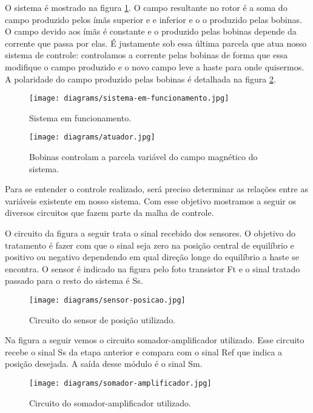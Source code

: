 O sistema é mostrado na figura \ref{fig:system}. O campo resultante no rotor é a soma do campo produzido pelos ímãs superior e e inferior e o o produzido pelas bobinas. O campo devido aos ímãs é constante e o produzido pelas bobinas depende da corrente que passa por elas. É justamente sob essa última parcela que atua nosso sistema de controle: controlamos a corrente pelas bobinas de forma que essa modifique o campo produzido e o novo campo leve a haste para onde quisermos. A polaridade do campo produzido pelas bobinas é detalhada na figura \ref{fig:atuador}.

\begin{figure}[H]
\centering
\texttt{[image: diagrams/sistema-em-funcionamento.jpg]}
\caption{Sistema em funcionamento.}
\label{fig:system}
\end{figure}

\begin{figure}[H]
\centering
\texttt{[image: diagrams/atuador.jpg]}
\caption{Bobinas controlam a parcela variável do campo magnético do sistema.}
\label{fig:atuador}
\end{figure}

Para se entender o controle realizado, será preciso determinar as
relações entre as variáveis existente em nosso sistema. Com esse 
objetivo mostramos a seguir os diversos circuitos que fazem parte da
malha de controle.


O circuito da figura a seguir trata o sinal recebido dos sensores. 
O objetivo do tratamento é fazer com que o sinal seja zero na posição central de equilíbrio e positivo ou negativo dependendo em qual direção longe do equilíbrio a haste se encontra. 
O sensor é indicado na figura pelo foto transistor Ft e o sinal tratado passado para o resto do sistema é Ss.

\begin{figure}[H]
\centering
\texttt{[image: diagrams/sensor-posicao.jpg]}
\caption{Circuito do sensor de posição utilizado.}
\label{fig:sensorposicao}
\end{figure}

Na figura a seguir vemos o circuito somador-amplificador utilizado.
Esse circuito recebe o sinal Ss da etapa anterior e compara com 
o sinal Ref que indica a posição desejada. A saída desse módulo é o sinal Sm.
\begin{figure}[H]
\centering
\texttt{[image: diagrams/somador-amplificador.jpg]}
\caption{Circuito do somador-amplificador utilizado.}
\label{fig:somad-amplif}
\end{figure}


